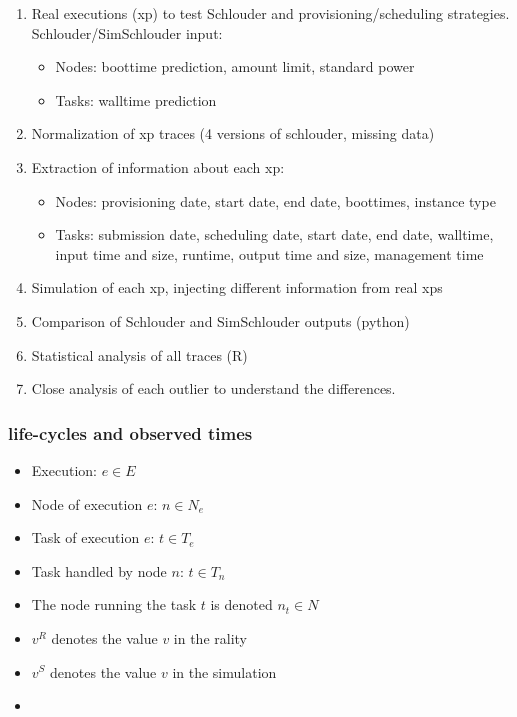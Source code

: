 \documentclass[parallelisme]{compas2017}
\begin{document}
\begin{enumerate}
 \item Real executions (xp) to test Schlouder and provisioning/scheduling 
strategies.
  Schlouder/SimSchlouder input:
  \begin{itemize}
   \item Nodes: boottime prediction, amount limit, standard power
   \item Tasks: walltime prediction
  \end{itemize}
 
 \item Normalization of xp traces (4 versions of schlouder, missing data)
 \item Extraction of information about each xp:
  \begin{itemize}
   \item Nodes: provisioning date, start date, end date, boottimes, instance 
type
   \item Tasks: submission date, scheduling date, start date, end date, 
	  walltime, input time and size, runtime, output time and size, 
management time
  \end{itemize}
 \item Simulation of each xp, injecting different information from real xps
 \item Comparison of Schlouder and SimSchlouder outputs (python)
 \item Statistical analysis of all traces (R)
 \item Close analysis of each outlier to understand the differences. 
\end{enumerate}

\subsubsection{life-cycles and observed times}

\begin{itemize}
 \item Execution: $e \in E$
 \item Node of execution $e$: $n \in N_e$
 \item Task of execution $e$: $t \in T_e$
 \item Task handled by node $n$: $t \in T_n$
 \item The node running the task $t$ is denoted $n_t \in N$
 \item $v^R$ denotes the value $v$ in the rality
 \item $v^S$ denotes the value $v$ in the simulation
 \item 
\end{itemize}
\end{document}
